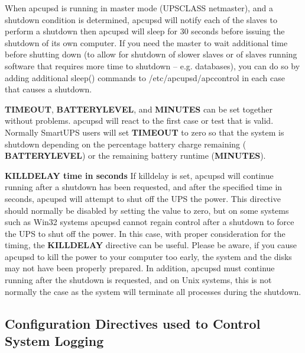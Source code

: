 {{{{{{{{{{{\begin{description}
When apcupsd is running in master mode (UPSCLASS netmaster), and a shutdown
condition is determined, apcupsd will notify each of the slaves to perform a
shutdown then apcupsd will sleep for 30 seconds before issuing the shutdown of
its own computer. If you need the master to wait additional time before
shutting down (to allow for shutdown of slower slaves or of slaves running
software that requires more time to shutdown {--} e.g. databases), you can do
so by adding additional sleep() commands to /etc/apcupsd/apccontrol in each
case that causes a shutdown.  

{\bf TIMEOUT}, {\bf BATTERYLEVEL}, and {\bf MINUTES} can be set together
without problems.  apcupsd will react to the first case or test that is valid.
Normally SmartUPS users will set {\bf TIMEOUT} to zero so that the system is
shutdown depending on the percentage battery charge remaining ({\bf
BATTERYLEVEL}) or the remaining battery runtime ({\bf MINUTES}).  

\label{KILLDELAY-_003ctime-in-seconds_003e}

\item {\bf KILLDELAY \lt{}time in seconds\gt{}}
   If killdelay is set, apcupsd will continue running after a shutdown has been
requested, and after the specified time in seconds, apcupsd will attempt to
shut off the UPS the power. This directive should normally be disabled by
setting the value to zero, but on some systems such as Win32 systems apcupsd
cannot regain control after a shutdown to force the UPS to shut off the power.
In this case, with proper consideration for the timing, the {\bf KILLDELAY}
directive can be useful.  Please be aware, if you cause apcupsd to kill the
power to your computer too early, the system and the disks may not have been
properly prepared.  In addition, apcupsd must continue running after the
shutdown is requested, and on Unix systems, this is not normally the case as
the system will terminate all processes during the shutdown.  
\end{description}

\label{Configuration-Directives-used-to-Control-System-Logging}

\subsection*{Configuration Directives used to Control System Logging}

}}}}}}}}}}}
